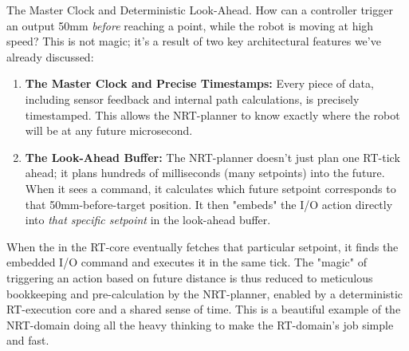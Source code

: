 \begin{principlebox}{The Master Clock and Deterministic Look-Ahead.}
    How can a controller trigger an output 50mm \textit{before} reaching a point, while the robot is moving at high speed? This is not magic; it's a result of two key architectural features we've already discussed:
    \begin{enumerate}
        \item \textbf{The Master Clock and Precise Timestamps:} Every piece of data, including sensor feedback and internal path calculations, is precisely timestamped. This allows the NRT-planner to know exactly where the robot will be at any future microsecond.
        \item \textbf{The Look-Ahead Buffer:} The NRT-planner doesn't just plan one RT-tick ahead; it plans hundreds of milliseconds (many setpoints) into the future. When it sees a  command, it calculates which future setpoint corresponds to that 50mm-before-target position. It then "embeds" the I/O action directly into \textit{that specific setpoint} in the look-ahead buffer.
    \end{enumerate}
    When the  in the RT-core eventually fetches that particular setpoint, it finds the embedded I/O command and executes it in the same tick. The "magic" of triggering an action based on future distance is thus reduced to meticulous bookkeeping and pre-calculation by the NRT-planner, enabled by a deterministic RT-execution core and a shared sense of time. This is a beautiful example of the NRT-domain doing all the heavy thinking to make the RT-domain's job simple and fast.
\end{principlebox}

